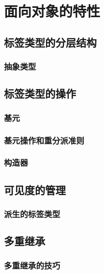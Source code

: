 %
%
%

\chapter{面向对象的特性}

\section{标签类型的分层结构}
\subsection{抽象类型}
\label{c:oof:tagged:abstract}

\section{标签类型的操作}

\subsection{基元}
\label{c:oof:tagged:primitive} %

\subsection{基元操作和重分派准则}
\label{c:oof:tagged:dispatch}

\subsection{构造器}
\label{c:oof:tagged:constructor} 

\section{可见度的管理}
\subsection{派生的标签类型}
\label{c:oof:tagged:visibility:derived-tag}
\section{多重继承}
\subsection{多重继承的技巧}
\label{c:oof:mul-inh:tech}

